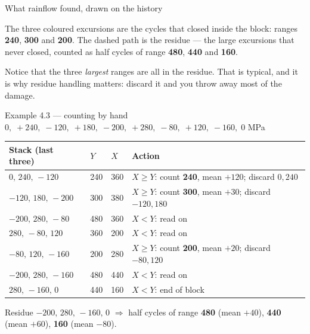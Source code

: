 \documentclass[aspectratio=169,10pt]{beamer}
\begin{document}
\begin{frame}{What rainflow found, drawn on the history}
\centering

\vspace{-2pt}

\raggedright\footnotesize
The three coloured excursions are the cycles that \alert{closed} inside the block: ranges \textcolor{red!70!black}{\textbf{240}}, \textcolor{orange!85!black}{\textbf{300}} and \textcolor{green!50!black}{\textbf{200}}. The dashed path is the \alert{residue} --- the large excursions that never closed, counted as half cycles of range \textbf{480}, \textbf{440} and \textbf{160}.
\vspace{2pt}

\begin{alertblock}{}
\footnotesize Notice that the three \emph{largest} ranges are all in the residue. That is typical, and it is why residue handling matters: discard it and you throw away most of the damage.
\end{alertblock}
\end{frame}

\begin{frame}{Example 4.3 --- counting by hand}
\footnotesize
$0,\;+240,\;-120,\;+180,\;-200,\;+280,\;-80,\;+120,\;-160,\;0$ \si{MPa}
\vspace{2pt}
\centering
\begin{tabular}{@{}llll@{}}
\toprule
Stack (last three) & $Y$ & $X$ & Action \\
\midrule
$0,\,240,\,-120$ & 240 & 360 & $X\ge Y$: count \textbf{240}, mean $+120$; discard $0,240$ \\
$-120,\,180,\,-200$ & 300 & 380 & $X\ge Y$: count \textbf{300}, mean $+30$; discard $-120,180$ \\
$-200,\,280,\,-80$ & 480 & 360 & $X<Y$: read on \\
$280,\,-80,\,120$ & 360 & 200 & $X<Y$: read on \\
$-80,\,120,\,-160$ & 200 & 280 & $X\ge Y$: count \textbf{200}, mean $+20$; discard $-80,120$ \\
$-200,\,280,\,-160$ & 480 & 440 & $X<Y$: read on \\
$280,\,-160,\,0$ & 440 & 160 & $X<Y$: end of block \\
\bottomrule
\end{tabular}
\vspace{4pt}

\raggedright
Residue $-200,\,280,\,-160,\,0$ $\Rightarrow$ half cycles of range \textbf{480} (mean $+40$), \textbf{440} (mean $+60$), \textbf{160} (mean $-80$).
\end{frame}
\end{document}
